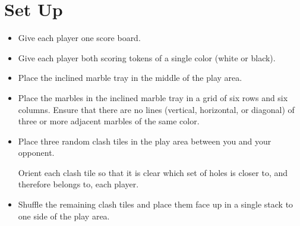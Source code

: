 \section*{Set Up}
\begin{itemize}[leftmargin=*]
\item Give each player one score board.
\item Give each player both scoring tokens of a single color (white or black).
\item Place the inclined marble tray in the middle of the play area.
\item Place the marbles in the inclined marble tray in a grid of six rows and six columns. Ensure that there are no lines (vertical, horizontal, or diagonal) of three or more adjacent marbles of the same color. 
\item Place three random clash tiles in the play area between you and your opponent.

Orient each clash tile so that it is clear which set of holes is closer to, and therefore belongs to, each player.

\item Shuffle the remaining clash tiles and place them face up in a single stack to one side of the play area.
\end{itemize}
